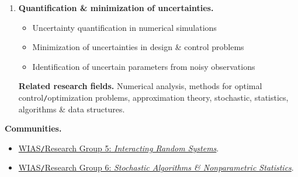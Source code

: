 \documentclass[oneside]{article}
\numberwithin{equation}{section}
\begin{document}
\begin{enumerate}
    \textbf{Classification of uncertainty.}
    \begin{itemize}
        \item \textit{Aleatoric uncertainty}\texttt{/}\textit{statistical uncertainty} is representative of unknowns that differ each time we run the same experiment. E.g., \textsc{Matlab} built-in function \texttt{rand()}.
        
        ``The quantification for the aleatoric uncertainties can be relatively straightforward, where traditional \href{https://en.wikipedia.org/wiki/Frequentist_probability}{(frequentist) probability} is the most basic form.''
        \item \textit{Epistemic uncertainty}\texttt{/}\textit{systematic uncertainty} is due to things one could in principle know but do not in practice, which may be because a measurement is not accurate, because the model neglects certain effects, or because particular data has been deliberately hidden. E.g., $g = 9.8{\rm m}\texttt{/}{\rm s}^2$ ignores the effects of air resistance.
        
        ``To evaluate epistemic uncertainties, the efforts are made to understand the (lack of) knowledge of the system, process or mechanism.''
    \end{itemize}
    ``Uncertainty quantification intends to explicitly express both types of uncertainty separately.''
    
    \textbf{Mathematical perspective of aleatoric \& epistemic uncertainty.} ``In mathematics, uncertainty is often characterized in terms of a \href{https://en.wikipedia.org/wiki/Probability_distribution}{probability distribution}. From that perspective, epistemic uncertainty means not being certain what the relevant probability distribution is, and aleatoric uncertainty means not being certain what a \href{https://en.wikipedia.org/wiki/Random_sample}{random sample} drawn from a probability distribution will be.''
    \item \textbf{Quantification \& minimization of uncertainties.}
    \begin{itemize}
        \item Uncertainty quantification in numerical simulations
        \item Minimization of uncertainties in design \& control problems
        \item Identification of uncertain parameters from noisy observations
    \end{itemize}
    \textbf{Related research fields.} Numerical analysis, methods for optimal control\texttt{/}optimization problems, approximation theory, stochastic, statistics, algorithms \& data structures.
\end{enumerate}
\textbf{Communities.}
\begin{itemize}
    \item \href{https://www.wias-berlin.de/research/rgs/fg5/index.jsp}{WIAS\texttt{/}Research Group 5: \textit{Interacting Random Systems}}.
    \item \href{https://www.wias-berlin.de/research/rgs/fg6/index.jsp}{WIAS\texttt{/}Research Group 6: \textit{Stochastic Algorithms \& Nonparametric Statistics}}.
\end{itemize}
\end{document}
